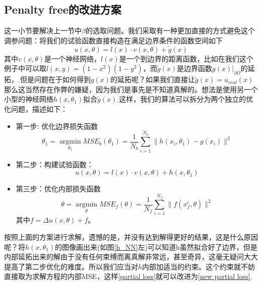 \documentclass{article}
\begin{document}
\subsection{Penalty free的改进方案}
这一小节要解决上一节中$\beta$的选取问题。我们采取有一种更加直接的方式避免这个调参问题：将我们的试验函数直接构造在满足边界条件的函数空间如下
$$
u(x,\theta) = l(x)\cdot v(x,\theta) + \tilde{g}(x)
$$
其中$v(x,\theta)$是一个神经网络，$l(x)$是一个到边界的距离函数，比如在我们这个例子中可以取$l(x,y) = (1-x^2)(1-y^2)$，而$\tilde{g}(x)$是边界函数$g(x)|_{\partial \Omega}$的延拓，.但是问题在于如何得到$g(x)$的延拓呢？如果我们直接让$\tilde{g}(x) = u_{real}(x)$那么这当然存在作弊的嫌疑，因为我们是事先是不知道真解的。想法是使用另一个小型的神经网络$h(x,\theta_1)$拟合$\tilde{g}(x)$.这样，我们的算法可以拆分为两个独立的优化问题，描述如下：
\begin{itemize}
\item 第一步: 优化边界损失函数
\begin{equation}\label{partial loss}
\theta_1 = \mathop{argmin}\limits_{\theta_1} MSE_b(\theta_1) = \frac{1}{N_b}\sum_{i=1}^{N_b} \|h(x_i,\theta_1)-g(x_i)\|^2
\end{equation}
\item 第二步：构建试验函数：
\begin{equation}\label{new trial fun}
u(x,\theta) = l(x)\cdot v(x,\theta) + h(x,\theta_1)
\end{equation}
\item 第三步：优化内部损失函数
\begin{equation}\label{int loss}
\theta = \mathop{argmin}\limits_{\theta} MSE_f(\theta) = \frac{1}{N_f}\sum_{i=1}^{N_f} \|f(x_f^i,\theta)\|^2
\end{equation}
其中$f = \Delta u(x,\theta) + f$。
\end{itemize}
按照上面的方案进行求解，遗憾的是，并没有达到解得更好的结果，这是什么原因呢？将$h(x,\theta_1)$的图像画出来(如图\ref{h_NN}左)可以知道h虽然拟合好了边界，但是内部延拓出来的解由于没有任何束缚而离真解非常远，甚至奇异，这毫无疑问大大提高了第二步优化的难度。所以我们应当对$h$内部加适当的约束。这个约束就不妨直接取为求解方程的内部MSE，这样\ref{partial loss}就可以改进为\ref{new partial loss}.
\end{document}
